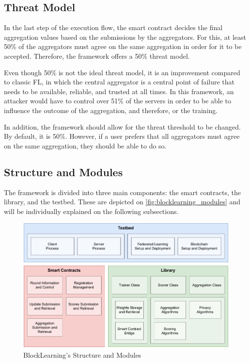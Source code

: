 \subsection{Threat Model}

In the last step of the execution flow, the smart contract decides the final aggregation values based on the submissions by the aggregators. For this, at least 50\% of the aggregators must agree on the same aggregation in order for it to be accepted. Therefore, the framework offers a 50\% threat model.

Even though 50\% is not the ideal threat model, it is an improvement compared to classic FL, in which the central aggregator is a central point of failure that needs to be available, reliable, and trusted at all times. In this framework, an attacker would have to control over 51\% of the servers in order to be able to influence the outcome of the aggregation, and therefore, or the training.

In addition, the framework should allow for the threat threshold to be changed. By default, it is 50\%. However, if a user prefers that all aggregators must agree on the same aggregation, they should be able to do so.

\subsection{Structure and Modules}\label{meth:struct_modules}

The framework is divided into three main components: the smart contracts, the library, and the testbed. These are depicted on \autoref{fig:blocklearning_modules} and will be individually explained on the following subsections.

\begin{figure}[!ht]
    \centering
    \includegraphics[width=1\textwidth]{graphics/modules.pdf}
    \caption{BlockLearning's  Structure and Modules}
    \label{fig:blocklearning_modules}
\end{figure}

